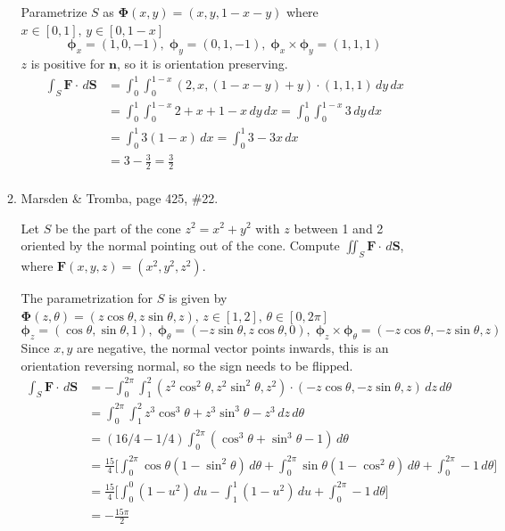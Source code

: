 \documentclass{article}
\begin{document}
\begin{enumerate}
\begin{enumerate}
                Parametrize $S$ as $\boldsymbol \Phi (x,y) = (x,y, 1-x-y)$ where $x \in [0,1],\, y \in [0, 1-x]$
                \[ \boldsymbol \phi_x = (1,0,-1) , \; \boldsymbol \phi_y = (0,1,-1),\; \boldsymbol \phi_x \times \boldsymbol \phi_y = (1,1,1)\]
                $z$ is positive for $\boldsymbol n$, so it is orientation preserving.
                \begin{align*}
                    \int_S \boldsymbol F \cdot \, d \boldsymbol S &= \int_0^1 \int_0^{1-x} (2,x, (1-x-y)+y) \cdot (1,1,1) \, dy \, dx \\
                    &= \int_0^1 \int_0^{1-x} 2+x+ 1-x \, dy \, dx = \int_0^1 \int_0^{1-x} 3 \, dy \, dx  \\
                    &= \int_0^1 3(1-x)\, dx = \int_0^1 3 - 3x \, dx  \\
                    &= 3 - \frac{3}{2} = \frac{3}{2} \\
                \end{align*}
                 \item Marsden \& Tromba, page 425, \#22.

                    Let $S$ be the part of the cone $z^2 = x^2 + y^2$ with $z$ between 1 and 2 oriented by the normal pointing out of the cone. Compute $\iint_S \boldsymbol F \cdot \, d \boldsymbol S$, where $\boldsymbol F (x,y,z) = (x^2, y^2, z^2)$.
                    
                    The parametrization for $S$ is given by $\boldsymbol \Phi (z, \theta) = (z\cos \theta, z\sin \theta, z),\, z \in [1,2],\, \theta \in [0,2\pi]$
                        \[ \boldsymbol \phi_z = (\cos \theta, \sin \theta, 1) , \; \boldsymbol \phi_\theta = (-z\sin\theta, z\cos\theta, 0),\; \boldsymbol \phi_z \times \boldsymbol \phi_\theta = (-z\cos\theta, -z\sin\theta, z) \]
                        Since $x, y$ are negative, the normal vector points inwards, this is an orientation reversing normal, so the sign needs to be flipped.
                        \begin{align*}
                            \int_S \boldsymbol F \cdot \, d \boldsymbol S &= - \int_0^{2\pi} \int_1^2 (z^2\cos^2\theta, z^2\sin^2\theta, z^2) \cdot (-z\cos\theta, -z\sin\theta, z) \, dz \, d\theta \\
                            &= \int_0^{2\pi} \int_1^2 z^3\cos^3\theta + z^3\sin^3\theta - z^3 \, dz \, d\theta \\
                            &= (16/4 - 1/4)\int_0^{2\pi} (\cos^3\theta + \sin^3\theta - 1) \, d\theta \\
                            &= \frac{15}{4} \bigg[ \int_0^{2\pi} \cos\theta(1 - \sin^2 \theta) \, d\theta + \int_0^{2\pi} \sin\theta(1 - \cos^2 \theta)\, d\theta + \int_0^{2\pi} - 1 \, d\theta \bigg] \\
                            &= \frac{15}{4} \bigg[ \int_0^{0} (1 - u^2 ) \, du - \int_1^{1} (1 - u^2 )\, du + \int_0^{2\pi} - 1 \, d\theta \bigg] \\
                            &= -\frac{15\pi}{2}
                        \end{align*} 
        \end{enumerate}


\end{enumerate}
\end{document}
